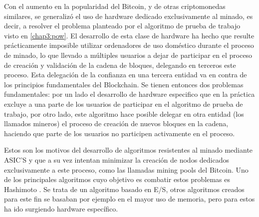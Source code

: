 Con el aumento en la popularidad del Bitcoin, y de otras criptomonedas similares, se generalizó el uso de hardware dedicado exclusivamente al minado, es decir, a resolver el problema planteado por el algoritmo de prueba de trabajo visto en \ref{chap3:pow}. El desarrollo de esta clase de hardware ha hecho que resulte prácticamente imposible utilizar ordenadores de uso doméstico durante el proceso de minado, lo que llevado a múltiples usuarios a dejar de participar en el proceso de creación y validación de la cadena de bloques, delegando en terceros este proceso. Esta delegación de la confianza en una tercera entidad va en contra de los principios fundamentales del Blockchain. Se tienen entonces dos problemas fundamentales: por un lado el desarrollo de hardware especifico que en la práctica excluye a una parte de los usuarios de participar en el algoritmo de prueba de trabajo, por otro lado, este algoritmo hace posible delegar en otra entidad (los llamados mineros) el proceso de creación de nuevos bloques en la cadena, haciendo que parte de los usuarios no participen activamente en el proceso.
\begin{figure}[H]
  \qquad
	\label{fig:test}%
\end{figure}
Estos son los motivos del desarrollo de algoritmos resistentes al minado mediante ASIC’S y que a su vez intentan minimizar la creación de nodos dedicados exclusivamente a este proceso, como las llamadas mining pools del Bitcoin. Uno de los principales algoritmos cuyo objetivo es combatir estos problemas es Hashimoto \citep{dryjahashimoto}. Se trata de un algoritmo basado en E/S, otros algoritmos creados para este fin se basaban por ejemplo en el mayor uso de memoria, pero para estos ha ido surgiendo hardware específico.

